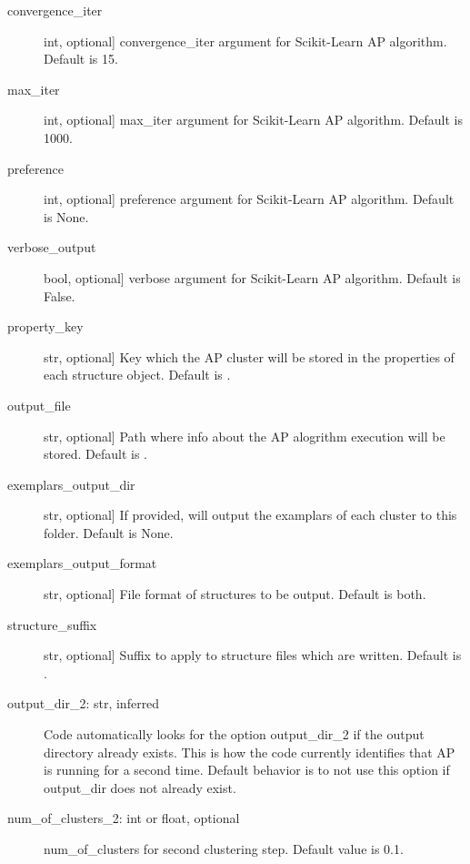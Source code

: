 \documentclass[letterpaper,10pt,english]{sphinxmanual}
\begin{document}
\begin{fulllineitems}
\begin{fulllineitems}
\begin{description}
\item[{convergence\_iter}] \leavevmode{[}int, optional{]}
convergence\_iter argument for Scikit-Learn AP algorithm.
Default is 15.

\item[{max\_iter}] \leavevmode{[}int, optional{]}
max\_iter argument for Scikit-Learn AP algorithm. Default is 1000.

\item[{preference}] \leavevmode{[}int, optional{]}
preference argument for Scikit-Learn AP algorithm. Default is None.

\item[{verbose\_output}] \leavevmode{[}bool, optional{]}
verbose argument for Scikit-Learn AP algorithm. Default is False.

\item[{property\_key}] \leavevmode{[}str, optional{]}
Key which the AP cluster will be stored in the properties of
each structure object. Default is .

\item[{output\_file}] \leavevmode{[}str, optional{]}
Path where info about the AP alogrithm execution will be stored.
Default is .

\item[{exemplars\_output\_dir}] \leavevmode{[}str, optional{]}
If provided, will output the examplars of each cluster to this
folder. Default is None.

\item[{exemplars\_output\_format}] \leavevmode{[}str, optional{]}
File format of structures to be output. Default is both.

\item[{structure\_suffix}] \leavevmode{[}str, optional{]}
Suffix to apply to structure files which are written.
Default is .

\item[{output\_dir\_2: str, inferred}] \leavevmode
Code automatically looks for the option output\_dir\_2 if the
output directory already exists. This is how the code currently
identifies that AP is running for a second time. Default behavior
is to not use this option if output\_dir does not already exist.

\item[{num\_of\_clusters\_2: int or float, optional}] \leavevmode
num\_of\_clusters for second clustering step. Default value is 0.1.


\end{description}
\end{fulllineitems}
\end{fulllineitems}
\end{document}
